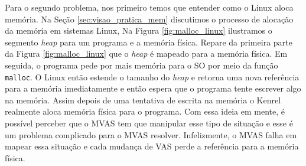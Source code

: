 
Para o segundo problema, nos primeiro temos que entender como o Linux aloca
memória. Na Seção \ref{sec:visao_pratica_mem} discutimos o processo de alocação
da memória em sistemas Linux, Na Figura \ref{fig:malloc_linux} ilustramos o
segmento \emph{heap} para um programa e a memória física. Repare da primeira
parte da Figura \ref{fig:malloc_linux} que o \emph{heap} é mapeado para a
memória física. Em seguida, o programa pede por mais memória para o SO por meio
da função \texttt{malloc}. O Linux então estende o tamanho do \emph{heap} e
retorna uma nova referência para a memória imediatamente e então espera que o
programa tente escrever algo na memória. Assim depois de uma tentativa de
escrita na memória o Kenrel realmente aloca memória física para o programa. Com
essa ideia em mente, é possível perceber que o MVAS tem que manipular esse tipo
de situação e esse é um problema complicado para o MVAS resolver. Infelizmente,
o MVAS falha em mapear essa situação e cada mudança de VAS perde a referência
para a memória física.

